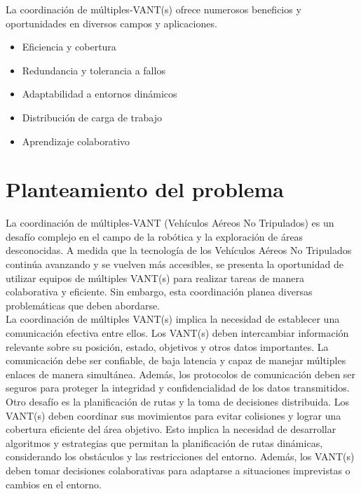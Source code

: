 \documentclass[11pt,epsf,times]{article}
\begin{document}
La coordinación de múltiples-VANT(s) ofrece numerosos beneficios y oportunidades en diversos campos y aplicaciones.

\begin{itemize}
\item Eficiencia y cobertura
\item Redundancia y tolerancia a fallos
\item Adaptabilidad a entornos dinámicos
\item Distribución de carga de trabajo
\item Aprendizaje colaborativo
\end{itemize}

\newpage
\section{Planteamiento del problema}

La coordinación de múltiples-VANT (Vehículos Aéreos No Tripulados) es un desafío complejo en el campo de la robótica y la exploración de áreas desconocidas. A medida que la tecnología de los Vehículos Aéreos No Tripulados continúa avanzando y se vuelven más accesibles, se presenta la oportunidad de utilizar equipos de múltiples VANT(s) para realizar tareas de manera colaborativa y eficiente. Sin embargo, esta coordinación planea diversas problemáticas que deben abordarse.\\

La coordinación de múltiples VANT(s) implica la necesidad de establecer una comunicación efectiva entre ellos. Los VANT(s) deben intercambiar información relevante sobre su posición, estado, objetivos y otros datos importantes. La comunicación debe ser confiable, de baja latencia y capaz de manejar múltiples enlaces de manera simultánea. Además, los protocolos de comunicación deben ser seguros para proteger la integridad y confidencialidad de los datos transmitidos.\\

Otro desafío es la planificación de rutas y la toma de decisiones distribuida. Los VANT(s) deben coordinar sus movimientos para evitar colisiones y lograr una cobertura eficiente del área objetivo. Esto implica la necesidad de desarrollar algoritmos y estrategias que permitan la planificación de rutas dinámicas, considerando los obstáculos y las restricciones del entorno. Además, los VANT(s) deben tomar decisiones colaborativas para adaptarse a situaciones imprevistas o cambios en el entorno.\\
\end{document}
